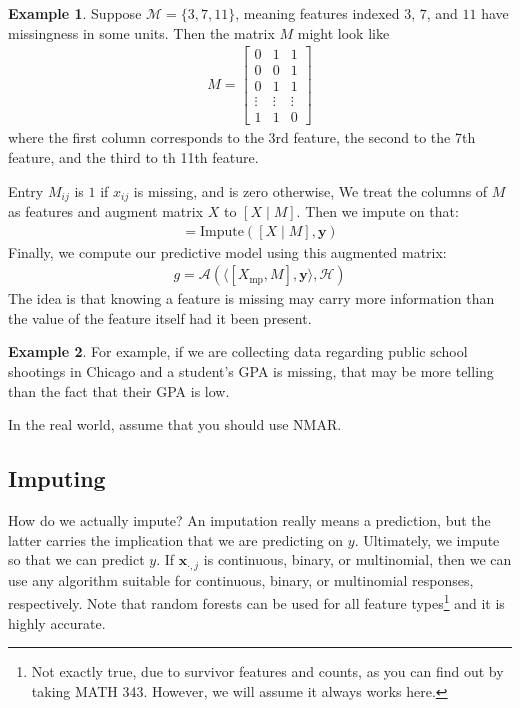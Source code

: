\documentclass[12pt, a4paper]{article}
\theoremstyle{definition}
\newtheorem*{example}{Example}
\begin{document}
	\begin{tcolorbox}
		\begin{example}
			Suppose $\mathcal{M} = \{3, 7, 11\}$, meaning features indexed $3$, $7$,
			and $11$ have missingness in some units. Then the matrix $M$ might look like
			\begin{align*}
				M = \begin{bmatrix}
					0 & 1 & 1\\
					0 & 0 & 1\\
					0 & 1 & 1\\
					\vdots & \vdots & \vdots\\
					1 & 1 & 0
				\end{bmatrix}
			\end{align*}
			where the first column corresponds to the 3rd feature, the
			second to the 7th feature, and the third to th 11th feature.
		\end{example}
	\end{tcolorbox}
	Entry $M_{ij}$ is $1$ if $x_{ij}$ is missing, and is zero otherwise,
	We treat the columns of $M$ as features and augment matrix $X$
	to $[X \mid M]$. Then we impute on that:
	\begin{align*}
		[X_{\text{imp}} \mid M] = \text{Impute}([X\mid M], \bm{y})
	\end{align*}
	Finally, we compute our predictive model using this augmented matrix:
	\begin{align*}
		g = \mathcal{A}(\langle [X_{\text{mp}}, M], \bm{y}\rangle, \mathcal{H})
	\end{align*}
	The idea is that knowing a feature is missing may carry more information
	than the value of the feature itself had it been present.
	\begin{tcolorbox}
		\begin{example}
			 For example,
			if we are collecting data regarding public school shootings in Chicago
			and a student's GPA is missing, that may be more telling than the
			fact that their GPA is low.
		\end{example}
	\end{tcolorbox}
	In the real world, assume that you should use NMAR.
	\subsection{Imputing}
	How do we actually impute? An imputation really means a prediction,
	but the latter carries the implication that we are predicting on $y$.
	Ultimately, we impute so that we can predict $y$. If $\bm{x}_{\cdot, j}$
	is continuous, binary, or multinomial, then we can use any algorithm
	suitable for continuous, binary, or multinomial responses, respectively.
	Note that random forests can be used for all feature
	types\footnote{Not exactly true, due to survivor features and counts, as you can find
		out by taking MATH 343. However, we will assume it always works here.
	}
	and it is highly accurate.
	
\end{document}
